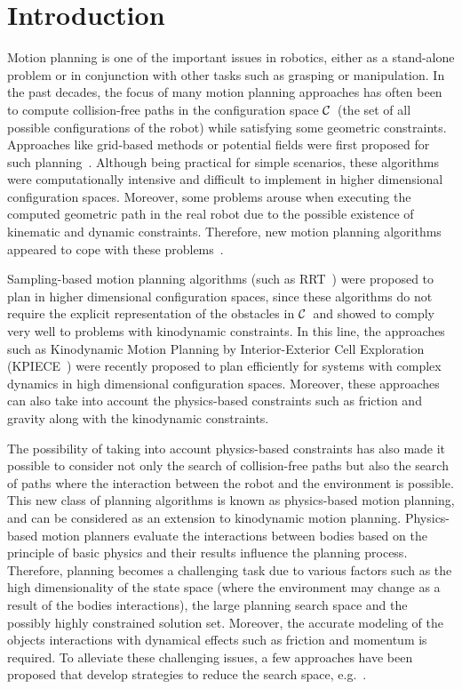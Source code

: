 \documentclass[twocolumn]{svjour3}          %
\newcommand {\Cs}{\hbox{{$\cal C$}}}                %
\begin{document}
\section{Introduction}

Motion planning is one of the important issues in robotics, either as a stand-alone problem or in conjunction with other tasks such as grasping or manipulation. In the past decades, 
the focus of many motion planning approaches has often been to compute collision-free paths in the configuration space \Cs~(the set of all possible configurations of the robot) while satisfying some geometric constraints. Approaches like grid-based methods or potential fields  were first proposed for such planning~\cite{latombe1991}. Although being practical for simple scenarios, these algorithms were computationally intensive and difficult to implement in higher dimensional configuration spaces. Moreover, some problems arouse when  executing the computed geometric path in the real robot due to the possible existence of kinematic and dynamic constraints. Therefore, new motion planning algorithms appeared to cope with these problems~\cite{choset2005,lavalle2006}.

Sampling-based motion planning algorithms (such as RRT~\cite{lavalle2001}) were proposed to plan in higher dimensional configuration spaces, since these algorithms do not require the explicit 
representation of the obstacles in \Cs~and showed to comply very well to problems with kinodynamic constraints. In this line, the approaches such as Kinodynamic Motion Planning by Interior-Exterior Cell Exploration (KPIECE~\cite{sucan2012}) were recently proposed to plan efficiently for systems with complex dynamics in high dimensional configuration spaces. Moreover, these approaches can also take into account the physics-based constraints such as friction and gravity along with the kinodynamic constraints.

The possibility of taking into account physics-based constraints has also made it possible to consider not only the search of collision-free paths but also the search of paths where the interaction between the robot and the environment is possible. This new class of planning algorithms is known as physics-based motion planning,
and can be considered as an extension to kinodynamic motion planning. Physics-based motion planners evaluate the  interactions between bodies based on the principle of basic physics and their results influence the planning process. Therefore, planning becomes a challenging task due to various factors such as the high dimensionality of the state space (where the environment may change as a result of the bodies interactions), the large planning search space and the possibly highly constrained solution set. Moreover, the accurate modeling of the objects interactions with dynamical effects such as friction and momentum is required. To alleviate these challenging issues, a few approaches have been proposed that develop strategies to reduce the search space, e.g.~\cite{zickler2009, zickler2010, muhayyuddin2015}.
\end{document}
